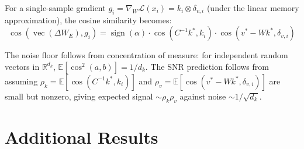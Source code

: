 For a single-sample gradient $g_i = \nabla_W \mathcal{L}(x_i) = k_i \otimes \delta_{v,i}$ (under the linear memory approximation), the cosine similarity becomes:
\[
\cos(\operatorname{vec}(\Delta W_E), g_i) = \operatorname{sign}(\alpha) \cdot \cos(C^{-1}k^*, k_i) \cdot \cos(v^* - Wk^*, \delta_{v,i})
\]

The noise floor follows from concentration of measure: for independent random vectors in $\mathbb{R}^{d_k}$, $\mathbb{E}[\cos^2(a, b)] = 1/d_k$.
The SNR prediction follows from assuming $\rho_k = \mathbb{E}[\cos(C^{-1}k^*, k_i)]$ and $\rho_v = \mathbb{E}[\cos(v^* - Wk^*, \delta_{v,i})]$ are small but nonzero, giving expected signal $\sim \rho_k \rho_v$ against noise $\sim 1/\sqrt{d_k}$.

\section{Additional Results}
\label{app:additional_results}

